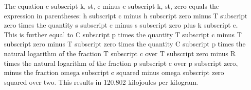 The equation e subscript k, st, c minus e subscript k, st, zero equals the expression in parentheses: h subscript c minus h subscript zero minus T subscript zero times the quantity s subscript c minus s subscript zero plus k subscript e. This is further equal to C subscript p times the quantity T subscript c minus T subscript zero minus T subscript zero times the quantity C subscript p times the natural logarithm of the fraction T subscript c over T subscript zero minus R times the natural logarithm of the fraction p subscript c over p subscript zero, minus the fraction omega subscript c squared minus omega subscript zero squared over two. This results in 120.802 kilojoules per kilogram.